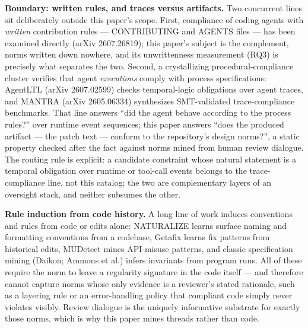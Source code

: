 \documentclass[11pt]{article}
\begin{document}
\textbf{Boundary: written rules, and traces versus artifacts.} Two concurrent lines sit deliberately outside this paper's scope. First, compliance of coding agents with \emph{written} contribution rules --- CONTRIBUTING and AGENTS files --- has been examined directly (arXiv 2607.26819); this paper's subject is the complement, norms written down nowhere, and its unwrittenness measurement (RQ3) is precisely what separates the two. Second, a crystallizing procedural-compliance cluster verifies that agent \emph{executions} comply with process specifications: AgentLTL (arXiv 2607.02599) checks temporal-logic obligations over agent traces, and MANTRA (arXiv 2605.06334) synthesizes SMT-validated trace-compliance benchmarks. That line answers ``did the agent behave according to the process rules?'' over runtime event sequences; this paper answers ``does the produced artifact --- the patch text --- conform to the repository's design norms?'', a static property checked after the fact against norms mined from human review dialogue. The routing rule is explicit: a candidate constraint whose natural statement is a temporal obligation over runtime or tool-call events belongs to the trace-compliance line, not this catalog; the two are complementary layers of an oversight stack, and neither subsumes the other.

\textbf{Rule induction from code history.} A long line of work induces conventions and rules from code or edits alone: NATURALIZE learns surface naming and formatting conventions from a codebase, Getafix learns fix patterns from historical edits, MUDetect mines API-misuse patterns, and classic specification mining (Daikon; Ammons et al.) infers invariants from program runs. All of these require the norm to leave a regularity signature in the code itself --- and therefore cannot capture norms whose only evidence is a reviewer's stated rationale, such as a layering rule or an error-handling policy that compliant code simply never violates visibly. Review dialogue is the uniquely informative substrate for exactly those norms, which is why this paper mines threads rather than code.
\end{document}
